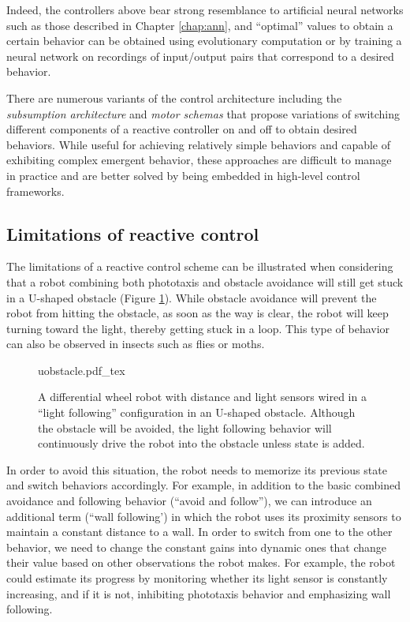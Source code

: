 Indeed, the controllers above bear strong resemblance to artificial neural networks such as those described in Chapter \ref{chap:ann}, and ``optimal'' values to obtain a certain behavior can be obtained using evolutionary computation \cite{floreano1998evolutionary} or by training a neural network on recordings of input/output pairs that correspond to a desired behavior. 

There are numerous variants of the control architecture including the \emph{subsumption architecture} \cite{brooks1990elephants} and \emph{motor schemas} \cite{arkin1989motor} that propose variations of switching different components of a reactive controller on and off to obtain desired behaviors. While useful for achieving relatively simple behaviors and capable of exhibiting complex emergent behavior, these approaches are difficult to manage in practice and are better solved by being embedded in high-level control frameworks.

\subsection{Limitations of reactive control}
The limitations of a reactive control scheme can be illustrated when considering that a robot combining both phototaxis and obstacle avoidance will still get stuck in a U-shaped obstacle (Figure \ref{fig:uobstacle}). While obstacle avoidance will prevent the robot from hitting the obstacle, as soon as the way is clear, the robot will keep turning toward the light, thereby getting stuck in a loop. This type of behavior can also be observed in insects such as flies or moths.

\begin{figure}
\centering
    \def\svgwidth{0.72\textwidth}
    {uobstacle.pdf_tex}
    \caption{\label{fig:uobstacle}A differential wheel robot with distance and light sensors wired in a ``light following'' configuration in an U-shaped obstacle. Although the obstacle will be avoided, the light following behavior will continuously drive the robot into the obstacle unless state is added.}
\end{figure}


In order to avoid this situation, the robot needs to memorize its previous state and switch behaviors accordingly. For example, in addition to the basic combined avoidance and following behavior (``avoid and follow''), we can introduce an additional term (``wall following') in which the robot uses its proximity sensors to maintain a constant distance to a wall. In order to switch from one to the other behavior, we need to change the constant gains into dynamic ones that change their value based on other observations the robot makes. For example, the robot could estimate its progress by monitoring whether its light sensor is constantly increasing, and if it is not, inhibiting phototaxis behavior and emphasizing wall following.

